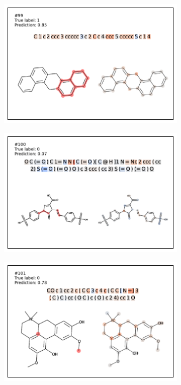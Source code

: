 \begin{figure}
\begin{subfigure}[b]{0.33\textwidth}
\end{subfigure}\begin{subfigure}[b]{0.33\textwidth} 
  \centering 
  \includegraphics[width=\textwidth]{figures/ames/ames99.pdf} 
\end{subfigure} 
\begin{subfigure}[b]{0.33\textwidth} 
  \centering 
  \includegraphics[width=\textwidth]{figures/ames/ames100.pdf} 
\end{subfigure}\begin{subfigure}[b]{0.33\textwidth} 
  \centering 
  \includegraphics[width=\textwidth]{figures/ames/ames101.pdf} 

\end{subfigure}
\end{figure}
